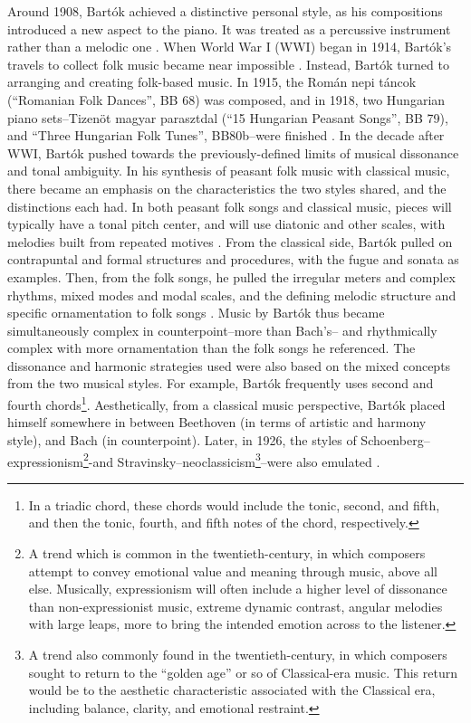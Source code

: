 Around 1908, Bartók achieved a distinctive personal style, as his compositions introduced a new aspect to the piano. It was treated as a percussive instrument rather than a melodic one \autocite{Burkholder_Grout_Palisca_2014}. When World War I (WWI) began in 1914, Bartók's travels to collect folk music became near impossible \autocite{Gillies}. Instead, Bartók turned to arranging and creating folk-based music. In 1915, the Román nepi táncok (``Romanian Folk Dances'', BB 68) was composed, and in 1918, two Hungarian piano sets--Tizenöt magyar parasztdal (``15 Hungarian Peasant Songs'', BB 79), and ``Three Hungarian Folk Tunes'', BB80b--were finished \autocite{Gillies}. In the decade after WWI, Bartók pushed towards the previously-defined limits of musical dissonance and tonal ambiguity. In his synthesis of peasant folk music with classical music, there became an emphasis on the characteristics the two styles shared, and the distinctions each had. In both peasant folk songs and classical music, pieces will typically have a tonal pitch center, and will use diatonic and other scales, with melodies built from repeated motives \autocite{Burkholder_Grout_Palisca_2014}. From the classical side, Bartók pulled on contrapuntal and formal structures and procedures, with the fugue and sonata as examples. Then, from the folk songs, he pulled the irregular meters and complex rhythms, mixed modes and modal scales, and the defining melodic structure and specific ornamentation to folk songs \autocite{Burkholder_Grout_Palisca_2014}. Music by Bartók thus became simultaneously complex in counterpoint--more than Bach's-- and rhythmically complex with more ornamentation than the folk songs he referenced. The dissonance and harmonic strategies used were also based on the mixed concepts from the two musical styles. For example, Bartók frequently uses second and fourth chords\footnote{In a triadic chord, these chords would include the tonic, second, and fifth, and then the tonic, fourth, and fifth notes of the chord, respectively.}. Aesthetically, from a classical music perspective, Bartók placed himself somewhere in between Beethoven (in terms of artistic and harmony style), and Bach (in counterpoint). Later, in 1926, the styles of Schoenberg--expressionism\footnote{A trend which is common in the twentieth-century, in which composers attempt to convey emotional value and meaning through music, above all else. Musically, expressionism will often include a higher level of dissonance than non-expressionist music, extreme dynamic contrast, angular melodies with large leaps, more to bring the intended emotion across to the listener.}-and Stravinsky--neoclassicism\footnote{A trend also commonly found in the twentieth-century, in which composers sought to return to the ``golden age'' or so of Classical-era music. This return would be to the aesthetic characteristic associated with the Classical era, including balance, clarity, and emotional restraint.}--were also emulated \autocite{Gillies}.

